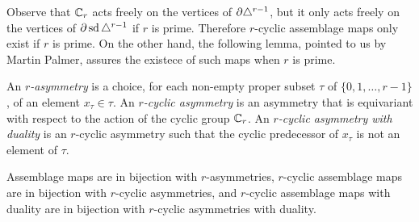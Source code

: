 
Observe that $\mathbb{C}_r$ acts freely on the vertices of $\partial \triangle^{r-1}$, but it only acts freely on the vertices of $\partial \operatorname{sd}\triangle^{r-1}$ if $r$ is prime. Therefore $r$-cyclic assemblage maps only exist if $r$ is prime. On the other hand, the following lemma, pointed to us by Martin Palmer, assures the existece of such maps when $r$ is prime.

\begin{definition}
	An \emph{$r$-asymmetry} is a choice, for each non-empty proper subset $\tau$ of $\{0,1,\ldots,r-1\}$, of an element $x_\tau\in \tau$. An \emph{$r$-cyclic asymmetry} is an asymmetry that is equivariant with respect to the action of the cyclic group $\mathbb{C}_r$. An \emph{$r$-cyclic asymmetry with duality} is an $r$-cyclic asymmetry such that the cyclic predecessor of $x_\tau$ is not an element of $\tau$.
\end{definition}

\begin{lemma}\label{lemma:asymmetry}
	Assemblage maps are in bijection with $r$-asymmetries, $r$-cyclic assemblage maps are in bijection with $r$-cyclic asymmetries, and $r$-cyclic assemblage maps with duality are in bijection with $r$-cyclic asymmetries with duality.
\end{lemma}

